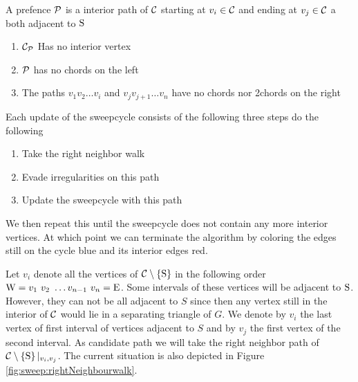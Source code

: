   \begin{defi}[Prefence]
    A prefence $\P$ is a interior path of $\C$ starting at $v_i \in \C$ and ending at $v_j \in \C$ a both adjacent to $\pS$
    \begin{enumerate}
      \itemsep=-4pt
      \renewcommand*{\labelenumi}{(P\arabic{enumi})}%
      \renewcommand*{\theenumi}{(P\arabic{enumi})}%

      \item  $\C_\P$ Has no interior vertex
      \label{p:noInteriorVertex}
      \item  $\P$ has no chords on the left     \label{p:Wchordfree}
      \item  The paths $v_1 v_2 \ldots v_i$ and $v_j v_{j+1} \ldots v_n$ have no chords nor 2chords on the right     \label{p:Cchordfree}
    \end{enumerate}
  \end{defi}

  Each update of the sweepcycle consists of the following three steps do the following
  \begin{enumerate}
    \itemsep=-4pt
    \item Take the right neighbor walk
    \item Evade irregularities on this path
    \item Update the sweepcycle with this path
  \end{enumerate}

  We then repeat this until the sweepcycle does not contain any more interior vertices. At which point we can terminate the algorithm by coloring the edges still on the cycle blue and its interior edges red.

    Let $v_i$ denote all the vertices of $\cpath$ in the following order $\pW =  v_1 \  v_2 \  \ldots v_{n-1} \  v_n = \pE$.
    Some intervals of these vertices will be adjacent to $\pS$. However, they can not be all adjacent to $S$ since then any vertex still in the interior of $\C$ would lie in a separating triangle of $G$. We denote by $v_i$ the last vertex of first interval of vertices adjacent to $S$ and by $v_j$ the first vertex of the second interval.
    As candidate path we will take the right neighbor path of $\cpath|_{v_i, v_j}$.
    The current situation is also depicted in Figure \ref{fig:sweep:rightNeighbourwalk}.

